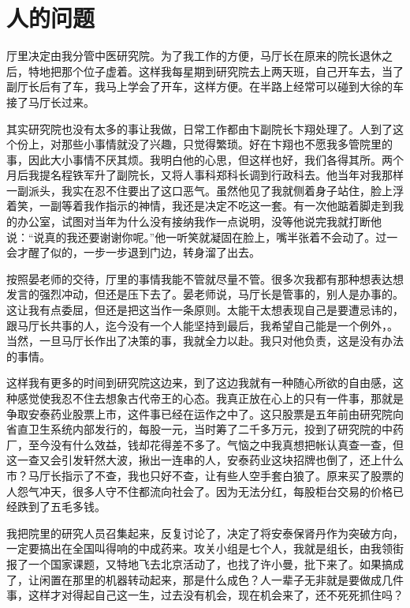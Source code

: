 \documentclass[12pt,oneside]{book}
\begin{document}
\chapter{人的问题}

厅里决定由我分管中医研究院。为了我工作的方便，马厅长在原来的院长退休之后，特地把那个位子虚着。这样我每星期到研究院去上两天班，自己开车去，当了副厅长后有了车，我马上学会了开车，这样方便。在半路上经常可以碰到大徐的车接了马厅长过来。

其实研究院也没有太多的事让我做，日常工作都由卞副院长卞翔处理了。人到了这个份上，对那些小事情就没了兴趣，只觉得繁琐。好在卞翔也不愿我多管院里的事，因此大小事情不厌其烦。我明白他的心思，但这样也好，我们各得其所。两个月后我提名程铁军升了副院长，又将人事科郑科长调到行政科去。他当年对我那样一副派头，我实在忍不住要出了这口恶气。虽然他见了我就侧着身子站住，脸上浮着笑，一副等着我作指示的神情，我还是决定不吃这一套。有一次他踮着脚走到我的办公室，试图对当年为什么没有接纳我作一点说明，没等他说完我就打断他说：``说真的我还要谢谢你呢。''他一听笑就凝固在脸上，嘴半张着不会动了。过一会才醒了似的，一步一步退到门边，转身溜了出去。

按照晏老师的交待，厅里的事情我能不管就尽量不管。很多次我都有那种想表达想发言的强烈冲动，但还是压下去了。晏老师说，马厅长是管事的，别人是办事的。这让我有点委屈，但还是把这当作一条原则。太能干太想表现自己是要遭忌讳的，跟马厅长共事的人，迄今没有一个人能坚持到最后，我希望自己能是一个例外，。当然，一旦马厅长作出了决策的事，我就全力以赴。我只对他负责，这是没有办法的事情。

这样我有更多的时间到研究院这边来，到了这边我就有一种随心所欲的自由感，这种感觉使我忍不住去想象古代帝王的心态。我真正放在心上的只有一件事，那就是争取安泰药业股票上市，这件事已经在运作之中了。这只股票是五年前由研究院向省直卫生系统内部发行的，每股一元，当时筹了二千多万元，投到了研究院的中药厂，至今没有什么效益，钱却花得差不多了。气恼之中我真想把帐认真查一查，但这一查又会引发轩然大波，揪出一连串的人，安泰药业这块招牌也倒了，还上什么市？马厅长指示了不查，我也只好不查，让有些人空手套白狼了。原来买了股票的人怨气冲天，很多人守不住都流向社会了。因为无法分红，每股柜台交易的价格已经跌到了五毛多钱。

我把院里的研究人员召集起来，反复讨论了，决定了将安泰保肾丹作为突破方向，一定要搞出在全国叫得响的中成药来。攻关小组是七个人，我就是组长，由我领街报了一个国家课题，又特地飞去北京活动了，也找了许小曼，批下来了。如果搞成了，让闲置在那里的机器转动起来，那是什么成色？人一辈子无非就是要做成几件事，这样才对得起自己这一生，过去没有机会，现在机会来了，还不死死抓住吗？
\end{document}
